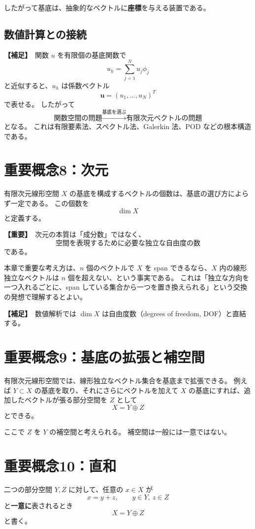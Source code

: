 \documentclass[a4paper,11pt]{ltjsarticle}
\newcommand{\suppitem}{\textbf{【補足】}}
\newcommand{\highimportance}{\textbf{【重要】}}
\begin{document}
したがって基底は、抽象的なベクトルに\textbf{座標}を与える装置である。

\subsection{数値計算との接続}
\suppitem\ 関数 $u$ を有限個の基底関数で
\[
u_h=\sum_{j=1}^{N}u_j\phi_j
\]
と近似すると、$u_h$ は係数ベクトル
\[
\bm{u}=(u_1,\dots,u_N)^T
\]
で表せる。
したがって
\[
\boxed{
\text{関数空間の問題}
\xrightarrow{\text{基底を選ぶ}}
\text{有限次元ベクトルの問題}
}
\]
となる。
これは有限要素法、スペクトル法、Galerkin 法、POD などの根本構造である。

\section{重要概念8：次元}

有限次元線形空間 $X$ の基底を構成するベクトルの個数は、基底の選び方によらず一定である。
この個数を
\[
\dim X
\]
と定義する。

\highimportance\ 次元の本質は「成分数」ではなく、
\[
\boxed{\text{空間を表現するために必要な独立な自由度の数}}
\]
である。

本章で重要な考え方は、$n$ 個のベクトルで $X$ を span できるなら、$X$ 内の線形独立なベクトルは $n$ 個を超えない、という事実である。
これは「独立な方向を一つ入れるごとに、span している集合から一つを置き換えられる」という交換の発想で理解するとよい。

\suppitem\ 数値解析では $\dim X$ は自由度数（degrees of freedom, DOF）と直結する。

\section{重要概念9：基底の拡張と補空間}

有限次元線形空間では、線形独立なベクトル集合を基底まで拡張できる。
例えば $Y\subset X$ の基底を取り、それにさらにベクトルを加えて $X$ の基底にすれば、追加したベクトルが張る部分空間を $Z$ として
\[
X=Y\oplus Z
\]
とできる。

ここで $Z$ を $Y$ の補空間と考えられる。
補空間は一般には一意ではない。

\section{重要概念10：直和}

二つの部分空間 $Y,Z$ に対して、任意の $x\in X$ が
\[
x=y+z,\qquad y\in Y,\ z\in Z
\]
と\textbf{一意に}表されるとき
\[
X=Y\oplus Z
\]
と書く。
\end{document}
